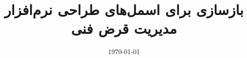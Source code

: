 \documentclass[11pt]{IUST-Book}
\title{
{\titlefont
		بازسازی برای اسمل‌های طراحی نرم‌افزار\\مدیریت قرض فنی
}
}
\author{
\lr{Girish Suryanarayana} 
\and \lr{Ganesh Samarthyam} 
\and \lr{Tushar Sharma}
}
\affiliation{دانشگاه صنعتی امیرکبیر}
\date{\today}
\begin{document}
\abovedisplayshortskip=10pt
\belowdisplayshortskip=8pt
\frontmatter
\pagestyle{empty}


\maketitle




\pagestyle{plain}

\setcounter{tocdepth}{2}
\begin{spacing}{1.2}
\tableofcontents
%
\end{spacing}

\renewcommand{\glossarypreamble}{\begin{multicols*}{2}}
\renewcommand{\glossarypostamble}{\end{multicols*}}

\begin{singlespace}
\end{singlespace}

\mainmatter
\pagestyle{fancy}










\begin{singlespace}
\small
{


}

%
\renewcommand{\glossarypreamble}{}
\renewcommand{\glossarypostamble}{}
\printglossary[style=listdotpage,type=main]
\renewcommand{\glsnamefont}[1]{\textrm{\latinfont #1}}
\renewcommand{\glossarypreamble}{\setLTR\DefaultMathsDigits}
\renewcommand{\glossarypostamble}{\setRTL\AutoMathsDigits}
\printglossary[style=listpagedot, type=dicep]

\printindex
\end{singlespace}
\end{document}
